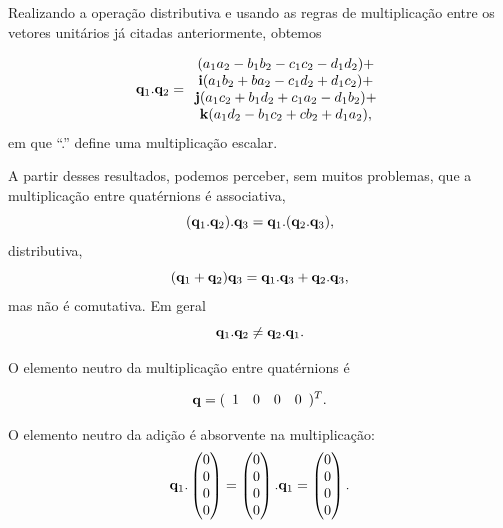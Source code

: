 Realizando a operação distributiva e usando as regras de multiplicação
entre os vetores unitários já citadas anteriormente, obtemos

\begin{equation}
\mathbf{\mathbf{q}}_{1}.\mathbf{\mathbf{q}}_{2}=\begin{array}{c}
(a_{1}a_{2}-b_{1}b_{2}-c_{1}c_{2}-d_{1}d_{2})+\\
\mathbf{i}(a_{1}b_{2}+ba_{2}-c_{1}d_{2}+d_{1}c_{2})+\\
\mathbf{j}(a_{1}c_{2}+b_{1}d_{2}+c_{1}a_{2}-d_{1}b_{2})+\\
\mathbf{k}(a_{1}d_{2}-b_{1}c_{2}+cb_{2}+d_{1}a_{2}),
\end{array}\label{eq:DefinicaoInicialMultiplicacaoQ}
\end{equation}
em que ``.'' define uma multiplicação escalar.

A partir desses resultados, podemos perceber, sem muitos problemas,
que a multiplicação entre quatérnions é associativa,
\begin{equation}
(\mathbf{q}_{1}.\mathbf{q}_{2}).\mathbf{q}_{3}=\mathbf{q}_{1}.(\mathbf{q}_{2}.\mathbf{q}_{3}),
\end{equation}
distributiva, 
\begin{equation}
(\mathbf{q}_{1}+\mathbf{q}_{2})\mathbf{q}_{3}=\mathbf{q}_{1}.\mathbf{q}_{3}+\mathbf{q}_{2}.\mathbf{q}_{3},
\end{equation}
mas não é comutativa. Em geral
\begin{equation}
\mathbf{q}_{1}.\mathbf{q}_{2}\neq\mathbf{q}_{2}.\mathbf{q}_{1}.
\end{equation}


O elemento neutro da multiplicação entre quatérnions é

\begin{equation}
\mathbf{q}=(\begin{array}{cccc}
1 & 0 & 0 & 0\end{array})^{T}.
\end{equation}


O elemento neutro da adição é absorvente na multiplicação:
\begin{equation}
\mathbf{q}_{1}.\begin{pmatrix}0\\
0\\
0\\
0
\end{pmatrix}=\begin{pmatrix}0\\
0\\
0\\
0
\end{pmatrix}.\mathbf{q}_{1}=\begin{pmatrix}0\\
0\\
0\\
0
\end{pmatrix}.
\end{equation}


